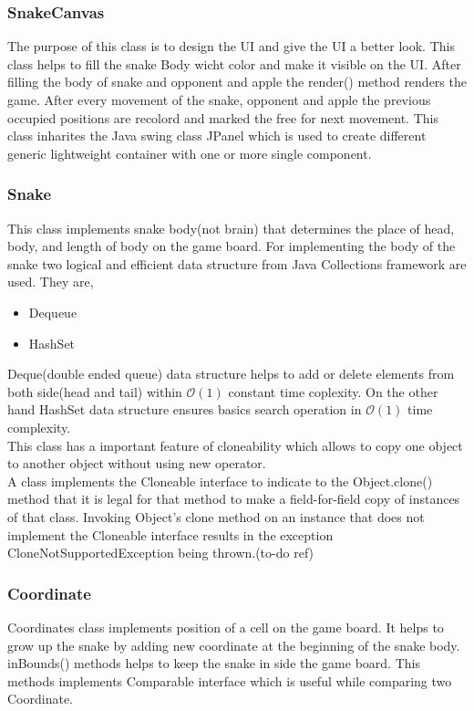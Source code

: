 \documentclass[a4paper,12pt]{article}
\begin{document}
\subsubsection{SnakeCanvas}
The purpose of this class is to design the UI and give the UI a better look. This class helps to fill the  snake Body wicht color and make it visible on the UI. After filling the body of snake and opponent and apple the render() method renders the game. After every movement of the snake, opponent and apple the previous occupied positions are recolord and marked the free for next movement. This class inharites the Java swing class JPanel which is used to create different generic lightweight container with one or more single component.
\subsubsection{Snake}
This class implements snake body(not brain) that determines the place of head, body, and length of body on the game board. For implementing the body of the snake two logical and efficient data structure from Java Collections framework are used. They are,
\begin{itemize}
\item Dequeue
\item HashSet
\end{itemize}
Deque(double ended queue) data structure helps to add or delete elements from both side(head and tail) within $\mathcal{O}(1)$ constant time coplexity. On the other hand HashSet data structure ensures basics search operation in $\mathcal{O}(1)$ time complexity.\\
This class has a important feature of cloneability which allows to copy one object to another object without using new operator.\\
A class implements the Cloneable interface to indicate to the Object.clone() method that it is legal for that method to make a field-for-field copy of instances of that class.
Invoking Object's clone method on an instance that does not implement the Cloneable interface results in the exception CloneNotSupportedException being thrown.(to-do ref)
\subsubsection{Coordinate}
Coordinates class implements position of a cell on the game board. It helps to grow up the snake by adding new coordinate at the beginning of the snake body. inBounds() methods helps to keep the snake in side the game board. This methods implements Comparable interface which is useful while comparing two Coordinate. 
\end{document}
